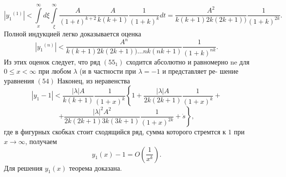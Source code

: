 $$|{y_1}^{(1)}| < {\int\limits_x^{\infty}d\xi } {\int\limits_\xi^\infty} {\frac
{A}{(1+t)^{k+2}}{\frac{A}{k(k+1)} \frac{1}{{(1+k)}^{k}}} dt} = \frac{A^2}{k(k+1
)2k(2k+1))} \frac{1}{{(1+k)}^{2k}} .$$
Полной индукцией легко доказывается оценка
$$ |{y_1}^{(n)}| < \frac{A^n}{k(k+1)2k(2k+1))\dots nk(nk+1)} \frac{1}{{(1+k)}^
{nk}} .$$
Из этих оценок следует, что ряд $(55_1)$ сходится абсолютно и равномерно \newli
ne
для $0 \leqslant x < \infty $ при любом $\lambda$ (и в частности при $\lambda =
-1 $ и представляет ре-\newline
шение уравнения $(54)$
Наконец, из неравенства
$$ |y_1 - 1| < \frac{|\lambda|A}{k(k+1)}\frac{1}{(1+x)^k}
\left \{ 1 + \frac{|\lambda|A}{2k(2k+1)}\frac{1}{(1+x)^k} + \right .$$
$$\left . + \frac{|\lambda|^2 A^2}{2k(2k+1)3k(3k+1)}\frac{1}{(1+x)^{2k}} + \dot
s \right \},$$
где в фигурных скобках стоит сходящийся ряд, сумма которого стремтся \newline
к $1$ при $x \to \infty $, получаем
$$ y_1(x) - 1 = O\left (\frac{1}{x^k}\right ) . $$
Для решения $ y_1(x)$ теорема доказана.
 
